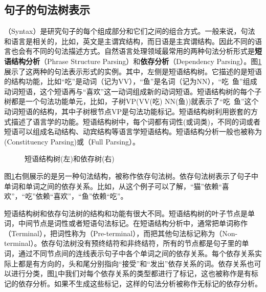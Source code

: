 \subsection{句子的句法树表示}

（Syntax）是研究句子的每个组成部分和它们之间的组合方式。一般来说，句法和语言是相关的，比如，英文是主谓宾结构，而日语是主宾谓结构。因此不同的语言也会有不同的句法描述方式。自然语言处理领域最常用的两种句法分析形式是{\small\sffamily\bfseries{短语结构分析}}（Phrase Structure Parsing）和{\small\sffamily\bfseries{依存分析}}（Dependency Parsing）。图\ref{fig:2-20}展示了这两种的句法表示形式的实例。其中，左侧是短语结构树。它描述的是短语的结构功能，比如``吃''是动词（记为VV），``鱼''是名词（记为NN），``吃\ 鱼''组成动词短语，这个短语再与``喜欢''这一动词组成新的动词短语。短语结构树的每个子树都是一个句法功能单元，比如，子树VP(VV(吃) NN(鱼))就表示了``吃\ 鱼''这个动词短语的结构，其中子树根节点VP是句法功能标记。短语结构树利用嵌套的方式描述了语言学的功能。短语结构树中，每个词都有词性(或词类)，不同的词或者短语可以组成名动结构、动宾结构等语言学短语结构。短语结构分析一般也被称为{\small{}}(Constituency Parsing)或{\small{}}（Full Parsing）。

\begin{figure}[htp]
    \centering

    \caption{短语结构树(左)和依存树(右)}
    \label{fig:2-20}
\end{figure}

\parinterval 图\ref{fig:2-20}右侧展示的是另一种句法结构，被称作依存句法树。依存句法树表示了句子中单词和单词之间的依存关系。比如，从这个例子可以了解，``猫''依赖``喜欢''，``吃''依赖``喜欢''，``鱼''依赖``吃''。

\parinterval 短语结构树和依存句法树的结构和功能有很大不同。短语结构树的叶子节点是单词，中间节点是词性或者短语句法标记。在短语结构分析中，通常把单词称作{\small{}}（Terminal），把词性称为{\small{}}（Pre-terminal），而把其他句法标记称为{\small{}}（Non-terminal）。依存句法树没有预终结符和非终结符，所有的节点都是句子里的单词，通过不同节点间的连线表示句子中各个单词之间的依存关系。每个依存关系实际上都是有方向的，头和尾分别指向``接受''和``发出''依存关系的词。依存关系也可以进行分类，图\ref{fig:2-20}中我们对每个依存关系的类型都进行了标记，这也被称作是有标记的依存分析。如果不生成这些标记，这样的句法分析被称作无标记的依存分析。

